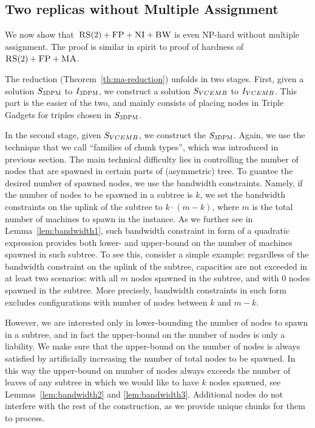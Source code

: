 \subsection{Two replicas without Multiple Assignment}\label{ap:tworep-ni}

We now show that~$\textsc{RS}(2)+\textsc{FP}+\textsc{NI}+\textsc{BW}$ is even NP-hard without multiple
assignment.
The proof is similar in spirit to proof of hardness of $\textsc{RS}(2)+\textsc{FP}+\textsc{MA}$.

The reduction (Theorem~\ref{th:ma-reduction}) unfolds in two stages.
First, given a solution $S_{\textsc{3DPM}}$ to $I_{\textsc{3DPM}}$, we construct a solution $S_{VCEMB}$ to $I_{VCEMB}$.
This part is the easier of the two, and mainly consists of placing nodes in Triple Gadgets for triples chosen in $S_{\textsc{3DPM}}$.

In the second stage, given $S_{VCEMB}$, we construct the $S_{\textsc{3DPM}}$.
Again, we use the technique that we call ``families of chunk types'', which was introduced in previous section.
The main technical difficulty lies in controlling the number of nodes that are spawned in certain parts of (asymmetric) tree.
To guantee the desired number of spawned nodes, we use the bandwidth constraints.
Namely, if the number of nodes to be spawned in a subtree is $k$, we set the bandwidth constraints on the uplink of the subtree to $k\cdot (m - k)$, where $m$ is the total number of machines to spawn in the instance.
As we further see in Lemma~\ref{lem:bandwidth1}, such bandwidth constraint in form of a quadratic expression provides both lower- and upper-bound on the number of machines spawned in such subtree.
To see this, consider a simple example: regardless of the bandwidth constraint on the uplink of the subtree, capacities are not exceeded in at least two scenarios: with all $m$ nodes spawned in the subtree, and with $0$ nodes spawned in the subtree.
More precisely, bandwidth constraints in such form excludes configurations with number of nodes between $k$ and $m-k$.

However, we are interested only in lower-bounding the number of nodes to spawn in a subtree, and in fact the upper-bound on the number of nodes is only a liability.
We make sure that the upper-bound on the number of nodes is always satisfied by artificially increasing the number of total nodes to be spawned.
In this way the upper-bound on number of nodes always exceeds the number of leaves of any subtree in which we would like to have $k$ nodes spawned, see Lemmas~\ref{lem:bandwidth2} and \ref{lem:bandwidth3}.
Additional nodes do not interfere with the rest of the construction, as we provide unique chunks for them to process.



